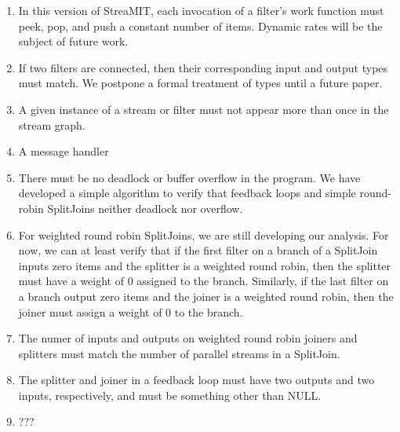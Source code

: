 \begin{enumerate}

\item In this version of StreaMIT, each invocation of a filter's work
function must peek, pop, and push a constant number of items.  Dynamic
rates will be the subject of future work.

\item If two filters are connected, then their corresponding input and
output types must match.  We postpone a formal treatment of types
until a future paper.

\item A given instance of a stream or filter must not appear more than
once in the stream graph.

\item A message handler 

\item There must be no deadlock or buffer overflow in the program.  We
have developed a simple algorithm to verify that feedback loops and
simple round-robin SplitJoins neither deadlock nor overflow.

\item For weighted round robin SplitJoins, we are still developing our
analysis.  For now, we can at least verify that if the first filter on
a branch of a SplitJoin inputs zero items and the splitter is a
weighted round robin, then the splitter must have a weight of 0
assigned to the branch.  Similarly, if the last filter on a branch
output zero items and the joiner is a weighted round robin, then the
joiner must assign a weight of 0 to the branch.

\item The numer of inputs and outputs on weighted round robin joiners
and splitters must match the number of parallel streams in a
SplitJoin.

\item The splitter and joiner in a feedback loop must have two outputs
and two inputs, respectively, and must be something other than NULL.

\item ???

\end{enumerate}
